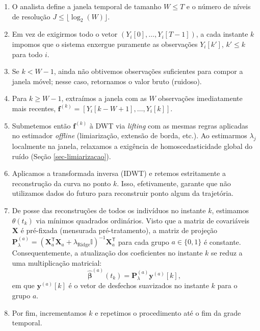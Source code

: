 \begin{estimatorboxB}
\begin{enumerate}
	\item O analista define a janela temporal de tamanho \(W \leq T\) e o número de níveis de resolução \(J \leq \lfloor\log_2(W)\rfloor\).
    \item Em vez de exigirmos todo o vetor \((Y_i[0], \dots, Y_i[T-1])\), a cada instante \(k\) impomos que o sistema enxergue puramente as observações \(Y_i[k']\), \(k' \leq k\) para todo \(i\).
    \item Se \(k < W - 1\), ainda não obtivemos observações suficientes para compor a janela móvel; nesse caso, retornamos o valor bruto (ruidoso).
    \item Para \(k \ge W - 1\), extraímos a janela com as \(W\) observações imediatamente mais recentes, \(\mathbf{f}^{(k)} = [Y_i[k - W + 1], \dots, Y_i[k]]\). 
    \item Submetemos então \(\mathbf{f}^{(k)}\) à DWT via \emph{lifting} com as mesmas regras aplicadas no estimador \emph{offline} (limiarização, extensão de borda, etc.). 
    Ao estimarmos \(\lambda_j\) localmente na janela, relaxamos a exigência de homoscedasticidade global do ruído (Seção \ref{sec-limiarizacao}).
    \item Aplicamos a transformada inversa (IDWT) e retemos estritamente a reconstrução da curva no ponto \(k\). 
    Isso, efetivamente, garante que não utilizamos dados do futuro para reconstruir ponto algum da trajetória.
    \item De posse das reconstruções de todos os indivíduos no instante \(k\), estimamos \(\theta(t_k)\) via mínimos quadrados ordinários. 
    Visto que a matriz de covariáveis \(\mathbf{X}\) é pré-fixada (mensurada pré-tratamento), a matriz de projeção \(\mathbf{P}_{\lambda}^{(a)} = (\mathbf{X}_a^{\mathsf{T}}\mathbf{X}_a + \lambda_{\text{Ridge}}\mathbb{I})^{-1}\mathbf{X}_a^{\mathsf{T}}\) para cada grupo \(a \in \{0, 1\}\) é constante. 
    Consequentemente, a atualização dos coeficientes no instante \(k\) se reduz a uma multiplicação matricial:
    \[
        \hat{\boldsymbol{\beta}}^{(a)}(t_k) = \mathbf{P}_{\lambda}^{(a)} \mathbf{y}^{(a)}[k],
    \]
    em que \(\mathbf{y}^{(a)}[k]\) é o vetor de desfechos suavizados no instante \(k\) para o grupo \(a\). 
    \item Por fim, incrementamos \(k\) e repetimos o procedimento até o fim da grade temporal.
\end{enumerate}
\end{estimatorboxB}

